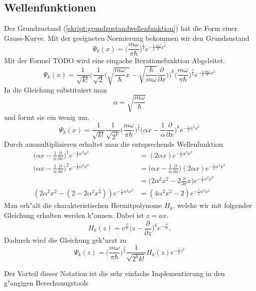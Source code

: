 \begin{refsection}
\subsection{Wellenfunktionen}
Der Grundzustand (\ref{skript:grundzustandwellenfunktion}) hat die Form einer Gauss-Kurve. Mit der geeigneten Normierung bekommen wir den Grundzustand
\[
\Psi_0(x)
=
\biggl(\frac{m\omega}{\pi\hbar}\biggr)^\frac14
e^{-\frac12\frac{m\omega}{\hbar}x^2}
\]
Mit der Formel TODO wird eine eingache Iterationsfunktion Abgeleitet.
\[
\Psi_k(x)
=
\frac1{\sqrt{k!}}\biggl(\frac1{\sqrt{2}}
\biggl(\sqrt{\frac{m\omega}{\hbar}x}-
\sqrt{\frac{\hbar}{m\omega}}\frac{\partial}{\partial x}\biggr)\biggr)^k
\biggl(\frac{m\omega}{\pi\hbar}\biggr)^\frac14
e^{-\frac12\frac{m\omega}{\hbar}x^2}
\]
In die Gleichung substituiert man
\[
\alpha=\sqrt{\frac{m\omega}\hbar}
\]
und formt sie ein wenig um.
\[
\Psi_k(x)
=
\frac1{\sqrt{k!}}\frac1{\sqrt{2^k}}
\biggl(\frac{m\omega}{\pi\hbar}\biggr)^\frac14
\biggl(\alpha x-\frac1{\alpha}\frac{\partial}{\partial x}\biggr)^k
e^{-\frac12\alpha^2x^2}
\]
Durch ausmultiplizieren erhaltet man die entsprechende Wellenfunktion
\begin{align*}
\biggl(\alpha x-\frac1{\alpha}\frac{\partial}{\partial x}\biggr)^1
e^{-\frac12\alpha^2x^2}
&=
(2\alpha x)e^{-\frac12\alpha^2x^2}
\\
\biggl(\alpha x-\frac1{\alpha}\frac{\partial}{\partial x}\biggr)^2
e^{-\frac12\alpha^2x^2}
&=
\biggl(\alpha x-\frac1{\alpha}\frac{\partial}{\partial x}\biggr)
(2\alpha x)e^{-\frac12\alpha^2x^2}
\\
&=
\biggl(2\alpha^2 x^2-2\frac{\partial}{\partial x}x\biggr)
e^{-\frac12\alpha^2x^2}
\\
(2\alpha^2x^2-(2-2\alpha^2x^2))e^{-\frac12\alpha^2x^2}
&=
(4\alpha^2x^2-2)e^{-\frac12\alpha^2x^2}
\end{align*}
Man erh"alt die charakteristischen Hermitpolynome $H_k$, welche wir mit folgender Gleichung erhalten werden k"onnen. Dabei ist $z=ax$.
\[
H_k(z)
=
e^{\frac{z^2}2}\biggl(z-\frac{\partial}{\partial z}\biggr)^k
e^{-\frac{z^2}2}.
\]
Dadurch wird die Gleichung gek"urzt zu
\[
\Psi_k(z)
=
\biggl(\frac{m\omega}{\pi\hbar}\biggr)^\frac14
\frac1{\sqrt{2^k k!}}H_k(z)
e^{-\frac12 z^2}
\]

Der Vorteil dieser Notation ist die sehr einfache Implementierung in den g"angigen Berechunugstools


\end{refsection}
